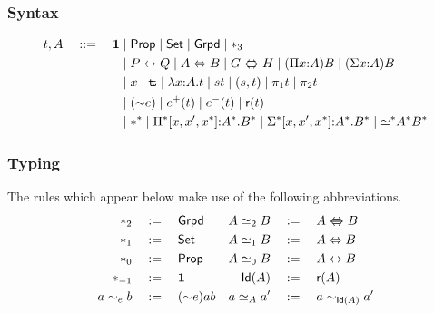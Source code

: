 \documentclass[12pt]{scrartcl}
\begin{document}
\pagestyle{empty}
\thispagestyle{empty}
\section*{\fbox{$\boldsymbol{\leqg}$}}
\subsubsection*{Syntax}
\begin{align*}
  t, A \quad ::= \quad \unitt &\mid \props \mid \sets \mid \grpds \mid
  \sta_3\\
&\mid P \lra Q \mid A \LRA B \mid G \gequiv H \mid (\Pi x {:} A) B \mid (\Sigma x {:} A) B \\
&\mid x \mid \ttt \mid \lambda x {:}A.t \mid s t \mid (s,t) \mid \pi_1 t \mid \pi_2 t \\
&\mid ({\sim}e) \mid e^+(t) \mid e^-(t) \mid \refl{t}\\
&\mid \sta^{\sta} \mid \Pi^* [x,x',x^*] {:} A^*. B^*
\mid \Sigma^* [x,x',x^*] {:} A^*. B^*
\mid {\ee{}^*} A^* B^*
\end{align*}
\subsubsection*{Typing}
The rules which appear below make use of the following
abbreviations.
\begin{align*}
\sta_2 &\df \grpds &
A \simeq_2 B &\df A \gequiv B \\
\sta_1 &\df \sets &
A \simeq_1 B &\df A  \LRA B\\
\sta_0 &\df \props &
A \simeq_0 B &\df A \lra B\\
\sta_{-1} &\df \unitt &
\idof{A} &\df \refl{A}\\
 a \sim_e b &\df ({\sim} e) a b&
a \ee A a' &\df a \sim_{\idof{A}} a'\\
\end{align*}

\begin{prooftree}
\end{prooftree}
\end{document}
